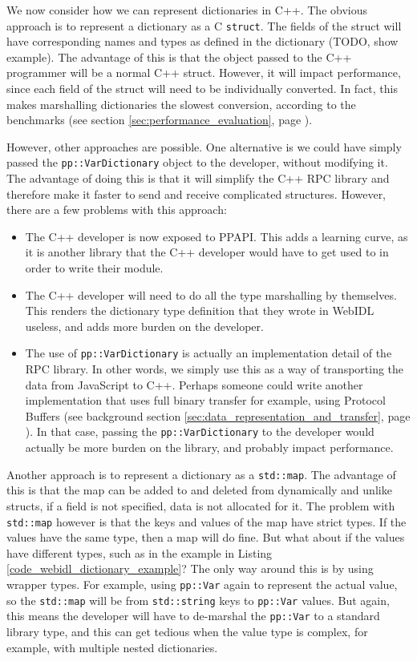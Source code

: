 We now consider how we can represent dictionaries in C++. The obvious approach is to represent a dictionary as a C \lstinline{struct}. The fields of the struct will have corresponding names and types as defined in the dictionary (TODO, show example). The advantage of this is that the object passed to the C++ programmer will be a normal C++ struct. However, it will impact performance, since each field of the struct will need to be individually converted. In fact, this makes marshalling dictionaries the slowest conversion, according to the benchmarks (see section \ref{sec:performance_evaluation}, page \pageref{sec:performance_evaluation}).

However, other approaches are possible. One alternative is we could have simply passed the \lstinline{pp::VarDictionary} object to the developer, without modifying it. The advantage of doing this is that it will simplify the C++ RPC library and therefore make it faster to send and receive complicated structures. However, there are a few problems with this approach:

\begin{itemize}
	\item The C++ developer is now exposed to PPAPI. This adds a learning curve, as it is another library that the C++ developer would have to get used to in order to write their module.
	\item The C++ developer will need to do all the type marshalling by themselves. This renders the dictionary type definition that they wrote in WebIDL useless, and adds more burden on the developer.
	\item The use of \lstinline{pp::VarDictionary} is actually an implementation detail of the RPC library. In other words, we simply use this as a way of transporting the data from JavaScript to C++. Perhaps someone could write another implementation that uses full binary transfer for example, using Protocol Buffers (see background section \ref{sec:data_representation_and_transfer}, page \pageref{sec:data_representation_and_transfer}). In that case, passing the \lstinline{pp::VarDictionary} to the developer would actually be more burden on the library, and probably impact performance.
\end{itemize}

Another approach is to represent a dictionary as a \lstinline{std::map}. The advantage of this is that the map can be added to and deleted from dynamically and unlike structs, if a field is not specified, data is not allocated for it. The problem with \lstinline{std::map} however is that the keys and values of the map have strict types. If the values have the same type, then a map will do fine. But what about if the values have different types, such as in the example in Listing \ref{code_webidl_dictionary_example}? The only way around this is by using wrapper types. For example, using \lstinline{pp::Var} again to represent the actual value, so the \lstinline{std::map} will be from \lstinline{std::string} keys to \lstinline{pp::Var} values. But again, this means the developer will have to de-marshal the \lstinline{pp::Var} to a standard library type, and this can get tedious when the value type is complex, for example, with multiple nested dictionaries.

